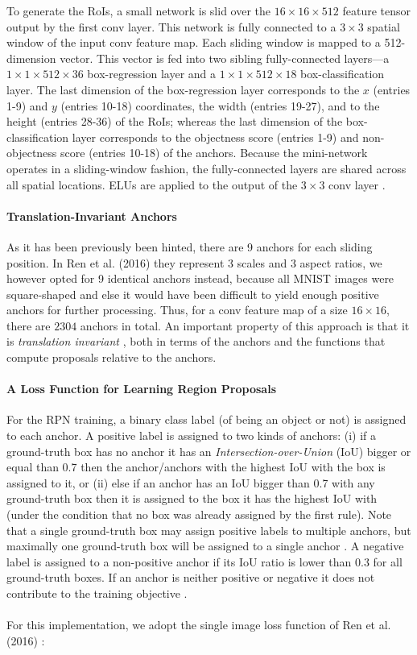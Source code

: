 \documentclass[a4paper]{article}
\begin{document}
To generate the RoIs, a small network is slid over the $16 \times 16 \times 512$ feature tensor output by the first conv layer. This network is fully connected to a $3 \times 3$ spatial window of the input conv feature map. Each sliding window is mapped to a 512-dimension vector. This vector is fed into two sibling fully-connected layers---a $1 \times 1 \times 512 \times 36$ box-regression layer and a $1 \times 1 \times 512 \times 18$ box-classification layer. The last dimension of the box-regression layer corresponds to the $x$ (entries 1-9) and $y$ (entries 10-18) coordinates, the width (entries 19-27), and to the height (entries 28-36) of the RoIs; whereas the last dimension of the box-classification layer corresponds to the objectness score (entries 1-9) and non-objectness score (entries 10-18) of the anchors. Because the mini-network operates in a sliding-window fashion, the fully-connected layers are shared across all spatial locations. ELUs are applied to the output of the $3 \times 3$ conv layer \cite{fasterrcnn}.

\paragraph{Translation-Invariant Anchors}
As it has been previously been hinted, there are 9 anchors for each sliding position. In Ren et al. (2016) \cite{fasterrcnn} they represent 3 scales and 3 aspect ratios, we however opted for 9 identical anchors instead, because all MNIST images were square-shaped and else it would have been difficult to yield enough positive anchors for further processing. Thus, for a conv feature map of a size $16 \times 16$, there are $2304$ anchors in total. An important property of this approach is that it is \emph{translation invariant} \cite{fasterrcnn}, both in terms of the anchors and the functions that compute proposals relative to the anchors.

\paragraph{A Loss Function for Learning Region Proposals}
For the RPN training, a binary class label (of being an object or not) is assigned to each anchor. A positive label is assigned to two kinds of anchors: (i) if a ground-truth box has no anchor it has an \emph{Intersection-over-Union} (IoU) bigger or equal than 0.7 then the anchor/anchors with the highest IoU with the box is assigned to it, or (ii) else if an anchor has an IoU bigger than 0.7 with any ground-truth box then it is assigned to the box it has the highest IoU with (under the condition that no box was already assigned by the first rule). Note that a single ground-truth box may assign positive labels to multiple anchors, but maximally one ground-truth box will be assigned to a single anchor \cite{fasterrcnn}. A negative label is assigned to a non-positive anchor if its IoU ratio is lower than 0.3 for all ground-truth boxes. If an anchor is neither positive or negative it does not contribute to the training objective \cite{fastrcnn}.
\\
\\
For this implementation, we adopt the single image loss function of Ren et al. (2016) \cite{fasterrcnn}:
\end{document}
